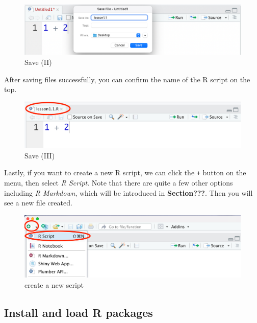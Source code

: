 \documentclass[
]{book}
\begin{document}
\begin{figure}

{\centering \includegraphics[width=0.7\linewidth]{pics/1save2} 

}

\caption{Save (II)}\label{fig:save2}
\end{figure}

After saving files successfully, you can confirm the name of the R script on the top.

\begin{figure}

{\centering \includegraphics[width=0.7\linewidth]{pics/1save3} 

}

\caption{Save (III)}\label{fig:save3}
\end{figure}

Lastly, if you want to create a new R script, we can click the \texttt{+} button on the menu, then select \emph{R Script}. Note that there are quite a few other options including \emph{R Markdown}, which will be introduced in \textbf{Section???}. Then you will see a new file created.

\begin{figure}

{\centering \includegraphics[width=0.7\linewidth]{pics/1new} 

}

\caption{create a new script}\label{fig:new}
\end{figure}

\hypertarget{install-and-load-r-packages}{%
\subsection{Install and load R packages}\label{install-and-load-r-packages}}
\end{document}
